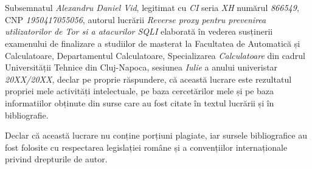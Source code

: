 \documentclass[12pt,a4paper,twoside,openright]{report}
\renewcommand{\thesisauthor}{Alexandru Daniel Vid}    %
\renewcommand{\thesismonth}{Iulie}     %
\renewcommand{\thesistitle}{Reverse proxy pentru prevenirea utilizatorilor de Tor si a atacurilor SQLI}
\begin{document}
\begin{titlepage}
\phantom{1}
\end{titlepage}



\begin{titlepage}

\begin{center}
\thispagestyle{firststylewithfooter}


{\scshape \facultynameromanian} \\
{\scshape \departmentnameromanian} \\
\end{center}

\vspace{3cm}

\begin{center}
\autheticitydeclarationsize \textbf{\autheticitydeclarationromanian}
\end{center}

\vspace{1cm}

Subsemnatul \textit{\thesisauthor}, legitimat cu \textit{CI} seria \textit{XH} numărul \textit{866549}, CNP \textit{1950417055056}, autorul lucrării \textit{\thesistitle} elaborată în vederea susținerii examenului de finalizare a studiilor de masterat la Facultatea de Automatică și Calculatoare, Departamentul Calculatoare, Specializarea \textit{Calculatoare} din cadrul Universității Tehnice din Cluj-Napoca, sesiunea \textit{\thesismonth} a anului univeristar \textit{20XX/20XX}, declar pe proprie răspundere, că această lucrare este rezultatul propriei mele activități intelectuale, pe baza cercetărilor mele și pe baza informatiilor obținute din surse care au fost citate în textul lucrării și în bibliografie.

Declar că această lucrare nu conține porțiuni plagiate, iar sursele bibliografice au fost folosite cu respectarea legislației române și a convențiilor internaționale privind drepturile de autor.


\end{titlepage}
\end{document}
